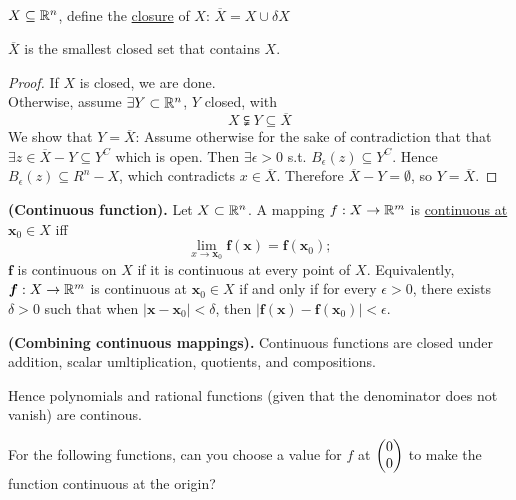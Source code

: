 \\

\begin{defn}
  $X \subseteq \mathbb{R}^n$, define the \ul{closure} of $X$: $\overline{X}=X\cup \delta X$
\end{defn}
\begin{theorem}
  $\overline{X}$ is the smallest closed set that contains $X$.
\end{theorem}
\begin{proof}
  If $X$ is closed, we are done. \\
  Otherwise, assume $\exists Y\subset \mathbb{R}^n$, $Y$ closed, with
  \[X\subsetneqq Y \subseteq \overline{X}\]
  We show that $Y=\overline{X}$: Assume otherwise for the sake of contradiction that that $\exists z\in \overline{X} - Y\subseteq Y^C$ which is open. Then $\exists \epsilon > 0$ s.t. $B_\epsilon (z)\subseteq Y^C$. Hence $B_\epsilon (z)\subseteq R^n-X $, which contradicts $x\in \overline{X}$. Therefore $\overline{X}-Y=\emptyset$, so $Y=\overline{X}$.
\end{proof}

\begin{defn}
  \textbf{(Continuous function). } Let $X\subset \mathbb{R}^n$. A mapping $f : X\rightarrow \mathbb{R}^m$ is \ul{continuous at} $\bm{x}_0\in X$ iff
  \[\lim_{x\rightarrow \bm{x}_0} \bm{f}(\bm{x}) = \bm{f}(\bm{x}_0);\]
  $\bm{f}$ is continuous on $X$ if it is continuous at every point of $X$. Equivalently, $\bm{f}: X\rightarrow \mathbb{R}^m$ is continuous at $\bm{x}_0\in X$ if and only if for every $\epsilon > 0$, there exists $\delta>0$ such that when $|\bm{x}-\bm{x}_0|<\delta$, then $|\bm{f}(\bm{x})-\bm{f}(\bm{x}_0)|<\epsilon$.
\end{defn}

\begin{theorem}
  \textbf{(Combining continuous mappings).} Continuous functions are closed under addition, scalar umltiplication, quotients, and compositions.
\end{theorem}

\begin{lemma}
Hence polynomials and rational functions (given that the denominator does not vanish) are continous.
\end{lemma}

 For the following functions, can you choose a value for $f$ at $\begin{pmatrix} 0 \\ 0 \end{pmatrix}$ to make the function continuous at the origin?

